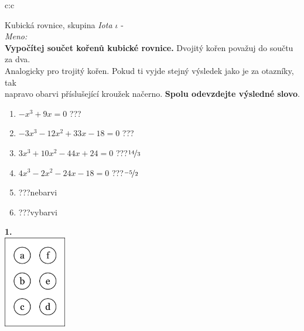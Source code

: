 \documentclass[10pt]{report}
\begin{document}
\begin{tabular}{c:c}
\begin{minipage}[c][99mm][t]{0.49\linewidth}
\begin{center}
\vspace{7mm}
{\huge Kubická rovnice, skupina \textit{Iota $\iota$} -}\\[4.5mm]
\textit{Meno:}\phantom{xxxxxxxxxxxxxxxxxxxxxxxxxxxxxxxxxxxxxxxxxxxxxxxxxxxxxxxxxxxxxxxxx}\\[3.5mm]
\textbf{Vypočítej součet kořenů kubické rovnice.} Dvojitý kořen považuj do součtu za dva.\\Analogicky pro trojitý kořen. Pokud ti vyjde stejný výsledek jako je za otazníky, tak\\napravo obarvi příslušející kroužek načerno. \textbf{Spolu odevzdejte výsledné slovo}.\\[3mm]
\begin{minipage}{0.77\linewidth}
\begin{center}
\begin{varwidth}{\textwidth}
\begin{enumerate}
\large
\item $-x^3+9x=0$\quad \dotfill\; ???\;\dotfill {}
\item $-3x^3-12x^2+33x-18=0$\quad \dotfill\; ???\;\dotfill {}
\item $3x^3+10x^2-44x+24=0$\quad \dotfill\; ???\;\dotfill \quad $\nicefrac{14}{3}$
\item $4x^3-2x^2-24x-18=0$\quad \dotfill\; ???\;\dotfill \quad $\nicefrac{-5}{2}$
\item \quad \dotfill\; ???\;\dotfill \quad nebarvi
\item \quad \dotfill\; ???\;\dotfill \quad vybarvi
\end{enumerate}
\end{varwidth}
\end{center}
\end{minipage}
\begin{minipage}{0.20\linewidth}
\begin{center}
{\Huge\bfseries 1.} \\[2mm]
\includegraphics[height=40mm]{../images/braille.png}

\end{center}
\end{minipage}
\end{center}
\end{minipage}
\end{tabular}
\end{document}
